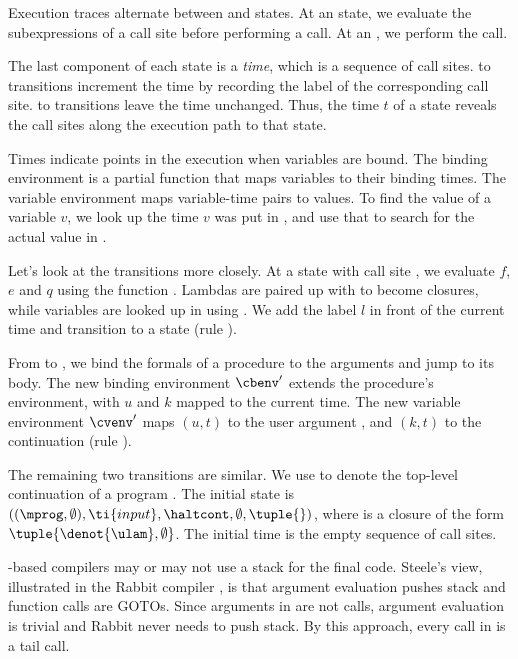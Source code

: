 \documentclass{LMCS}
\theoremstyle{definition} \newtheorem{property}[thm]{Property}
\begin{document}
Execution traces alternate between \deval{} and \dapply{} states.
At an \deval{} state, we evaluate the subexpressions of a call site before
performing a call.
At an \dapply, we perform the call.

The last component of each state is a \emph{time}, which is a sequence of 
call sites.
\deval{} to \dapply{} transitions increment the time by recording the label
of the corresponding call site.
\dapply{} to \deval{} transitions leave the time unchanged.
Thus, the time $t$ of a state reveals the call sites along the execution path
to that state.

Times indicate points in the execution when variables are bound.
The binding environment \cbenv{} is a partial function that maps variables 
to their binding times.
The variable environment \cvenv{} maps variable-time pairs to values.
To find the value of a variable $v$, we look up the time $v$ was put in \cbenv, 
and use that to search for the actual value in \cvenv.

Let's look at the transitions more closely.
At a \dueval{} state with call site \ucall, we evaluate $f$, $e$ and $q$
using the function \cbigaNA.
Lambdas are paired up with \cbenv{} to become closures, while variables are 
looked up in \cvenv{} using \cbenv.
We add the label $l$ in front of the current time and transition to a 
\duapply{} state (rule ).

From \duapply{} to \deval{}, we bind the formals of a procedure 
\tuple{\denot{\ulam}, \cbenv} to the arguments and jump to its body.
The new binding environment $\cbenv'$ extends the procedure's environment, with
$u$ and $k$ mapped to the current time.
The new variable environment $\cvenv'$ maps $(u, t)$ to the user argument 
\cuarg, and $(k, t)$ to the continuation \ccarg{} (rule ).

The remaining two transitions are similar.
We use \haltcont{} to denote the top-level continuation of a program \mprog.
The initial state \initstate{} is 
$((\mprog,\emptyset), \ti{input}, \haltcont, \emptyset, \tuple{})$, 
where  is a closure of the form $\tuple{\denot{\ulam},\emptyset}$.
The initial time is the empty sequence of call sites.

\cps{}-based compilers may or may not use a stack for the final code.
Steele's view, illustrated in the Rabbit compiler 
\cite{masters/mit/78/steel/rabbit}, is that argument evaluation pushes stack and
function calls are {\small GOTO}s.
Since arguments in \cps{} are not calls,
argument evaluation is trivial and Rabbit never needs to push stack.
By this approach, every call in \cps{} is a tail call.
\end{document}
